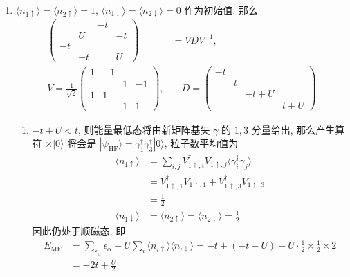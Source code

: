\documentclass[../../main.tex]{subfiles}
\begin{document}
\begin{enumerate}
  \item $\langle n_{1\uparrow}\rangle = \langle n_{2\uparrow}\rangle = 1$, $\langle n_{1\downarrow}\rangle = \langle n_{2\downarrow}\rangle = 0$ 作为初始值. 那么
  \begin{align*}
    \begin{pmatrix}
       &  & -t & \\
       & U & & -t\\
      -t & &  &  \\
       & -t &  & U
    \end{pmatrix} &= VDV^{-1},\\
    V = \frac{1}{\sqrt{2}}\begin{pmatrix}
      1 & -1 &   &  \\
        &    & 1 & -1\\
      1 &  1 &   &   \\
        &    & 1 &  1
    \end{pmatrix},&\quad D = \begin{pmatrix}
      -t &  &  & \\
       & t & & \\
       & & -t+U &  \\
       & & & t + U
    \end{pmatrix}
  \end{align*}
  \begin{enumerate}
    \item $-t+U < t$, 则能量最低态将由新矩阵基矢 $\gamma$ 的 $1,3$ 分量给出, 那么产生算符 $\times|0\rangle$ 将会是 $|\psi_{\text{HF}}\rangle = \gamma_{1}^{\dagger}\gamma_{3}^{\dagger}|0\rangle$, 粒子数平均值为
    \begin{align*}
      \langle n_{1\uparrow}\rangle &= \sum_{i,j}V_{1\uparrow,i}^{\dagger}V_{1\uparrow,j}\langle\gamma_{i}^{\dagger}\gamma_{j}\rangle\\
      &= V_{1\uparrow,1}^{\dagger}V_{1\uparrow,1} + V_{1\uparrow,3}^{\dagger}V_{1\uparrow,3} \\
      &= \frac{1}{2}\\
      \langle n_{1\downarrow}\rangle &= \langle n_{2\uparrow}\rangle = \langle n_{2\downarrow}\rangle = \frac{1}{2}
    \end{align*}
    因此仍处于顺磁态, 即 
    \begin{align*}
      E_{\text{MF}} &= \sum_{\varepsilon_{\alpha}}\epsilon_{\alpha} - U\sum_{i}\langle n_{i\uparrow}\rangle\langle n_{i\downarrow}\rangle = -t + (-t + U) + U\cdot\frac{1}{2}\times\frac{1}{2}\times 2 \\
      &= -2t + \frac{U}{2}
    \end{align*}


\end{enumerate}
\end{enumerate}
\end{document}
